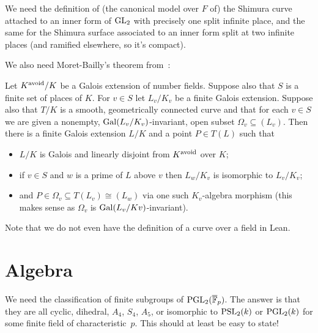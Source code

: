 \begin{definition}\label{Shimura_varieties}\notready We need the definition of (the canonical model over $F$ of) the Shimura curve attached to an inner form of $\operatorname{GL}_2$ with precisely one split infinite place, and the same for the Shimura surface associated to an inner form split at two infinite places (and ramified elsewhere, so it's compact).
\end{definition}

We also need Moret-Bailly's theorem from~\cite{moret-bailly}:

\begin{theorem}\label{moret-bailly}\notready Let $K^{\operatorname{avoid}}/K$ be a Galois extension of number fields. Suppose also
that $S$ is a finite set of places of $K$. For $v\in S$ let $L_v/K_v$ be a finite Galois extension.
Suppose also that $T /K$ is a smooth, geometrically connected curve and that for each
$v\in S$ we are given a nonempty, $\operatorname{Gal}(L_v/K_v)$-invariant, open subset $\Omega_v\subseteq (L_v)$.
Then there is a finite Galois extension $L/K$ and a point $P ∈ T (L)$ such that
\begin{itemize}
\item $L/K$ is Galois and linearly disjoint from $K^{\operatorname{avoid}}$ over $K$;
\item if $v\in S$ and $w$ is a prime of $L$ above $v$ then $L_w /K_v$ is isomorphic to $L_v/K_v$;
\item and $P \in\Omega_v\subseteq T (L_v) \cong (L_w)$ via one such $K_v$-algebra morphism
(this makes sense as $\Omega_v$ is $\operatorname{Gal}(L_v/K v)$-invariant).
\end{itemize}
\end{theorem}

Note that we do not even have the definition of a curve over a field in Lean.

\section{Algebra}

We need the classification of finite subgroups of $\operatorname{PGL}_2(\overline{\mathbb{F}}_p)$. The answer is that they are all cyclic, dihedral, $A_4$, $S_4$, $A_5$, or isomorphic to $\operatorname{PSL}_2(k)$ or $\operatorname{PGL}_2(k)$ for some finite field of characteristic~$p$. This should at least be easy to state!
